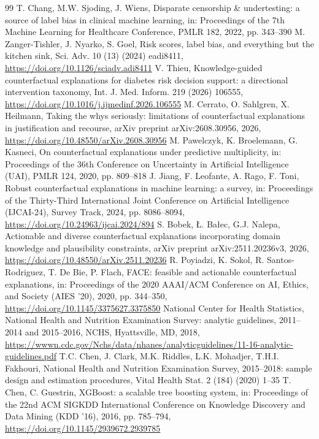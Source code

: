 \documentclass[final,5p,times,twocolumn]{elsarticle}
\begin{document}
\begin{thebibliography}{99}
 T. Chang, M.W. Sjoding, J. Wiens, Disparate censorship \& undertesting: a source of label bias in clinical machine learning, in: Proceedings of the 7th Machine Learning for Healthcare Conference, PMLR 182, 2022, pp. 343–390
 M. Zanger-Tishler, J. Nyarko, S. Goel, Risk scores, label bias, and everything but the kitchen sink, Sci. Adv. 10 (13) (2024) eadi8411, \url{https://doi.org/10.1126/sciadv.adi8411}
 V. Thieu, Knowledge-guided counterfactual explanations for diabetes risk decision support: a directional intervention taxonomy, Int. J. Med. Inform. 219 (2026) 106555, \url{https://doi.org/10.1016/j.ijmedinf.2026.106555}
 M. Cerrato, O. Sahlgren, X. Heilmann, Taking the whys seriously: limitations of counterfactual explanations in justification and recourse, arXiv preprint arXiv:2608.30956, 2026, \url{https://doi.org/10.48550/arXiv.2608.30956}
 M. Pawelczyk, K. Broelemann, G. Kasneci, On counterfactual explanations under predictive multiplicity, in: Proceedings of the 36th Conference on Uncertainty in Artificial Intelligence (UAI), PMLR 124, 2020, pp. 809–818
 J. Jiang, F. Leofante, A. Rago, F. Toni, Robust counterfactual explanations in machine learning: a survey, in: Proceedings of the Thirty-Third International Joint Conference on Artificial Intelligence (IJCAI-24), Survey Track, 2024, pp. 8086–8094, \url{https://doi.org/10.24963/ijcai.2024/894}
 S. Bobek, Ł. Bałec, G.J. Nalepa, Actionable and diverse counterfactual explanations incorporating domain knowledge and plausibility constraints, arXiv preprint arXiv:2511.20236v3, 2026, \url{https://doi.org/10.48550/arXiv.2511.20236}
 R. Poyiadzi, K. Sokol, R. Santos-Rodriguez, T. De Bie, P. Flach, FACE: feasible and actionable counterfactual explanations, in: Proceedings of the 2020 AAAI/\allowbreak{}ACM Conference on AI, Ethics, and Society (AIES '20), 2020, pp. 344–350, \url{https://doi.org/10.1145/3375627.3375850}
 National Center for Health Statistics, National Health and Nutrition Examination Survey: analytic guidelines, 2011–2014 and 2015–2016, NCHS, Hyattsville, MD, 2018, \url{https://wwwn.cdc.gov/Nchs/data/nhanes/analyticguidelines/11-16-analytic-guidelines.pdf}
 T.C. Chen, J. Clark, M.K. Riddles, L.K. Mohadjer, T.H.I. Fakhouri, National Health and Nutrition Examination Survey, 2015–2018: sample design and estimation procedures, Vital Health Stat. 2 (184) (2020) 1–35
 T. Chen, C. Guestrin, XGBoost: a scalable tree boosting system, in: Proceedings of the 22nd ACM SIGKDD International Conference on Knowledge Discovery and Data Mining (KDD '16), 2016, pp. 785–794, \url{https://doi.org/10.1145/2939672.2939785}

\end{thebibliography}
\end{document}
